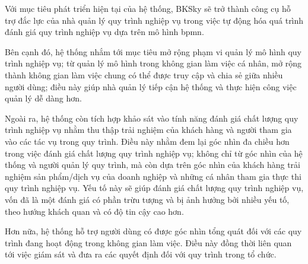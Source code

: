 
Với mục tiêu phát triển hiện tại của hệ thống, BKSky sẽ trở thành công cụ hỗ trợ đắc lực của nhà quản lý quy trình nghiệp vụ trong việc tự động hóa quá trình đánh giá quy trình nghiệp vụ dựa trên mô hình \acrfull*{bpmn}.

Bên cạnh đó, hệ thống nhắm tới mục tiêu mở rộng phạm vi quản lý mô hình quy trình nghiệp vụ; từ quản lý mô hình trong không gian làm việc cá nhân, mở rộng thành không gian làm việc chung có thể được truy cập và chia sẻ giữa nhiều người dùng; điều này giúp nhà quản lý tiếp cận hệ thống và thực hiện công việc quản lý dễ dàng hơn.

Ngoài ra, hệ thống còn tích hợp khảo sát vào tính năng đánh giá chất lượng quy trình nghiệp vụ nhằm thu thập trải nghiệm của khách hàng và người tham gia vào các tác vụ trong quy trình. Điều này nhằm đem lại góc nhìn đa chiều hơn trong việc đánh giá chất lượng quy trình nghiệp vụ; không chỉ từ góc nhìn của hệ thống và người quản lý quy trình, mà còn dựa trên góc nhìn của khách hàng trải nghiệm sản phẩm/dịch vụ của doanh nghiệp và những cá nhân tham gia thực thi quy trình nghiệp vụ. Yếu tố này sẽ giúp đánh giá chất lượng quy trình nghiệp vụ, vốn đã là một đánh giá có phần trừu tượng và bị ảnh hưởng bởi nhiều yếu tố, theo hướng khách quan và có độ tin cậy cao hơn.

Hơn nữa, hệ thống hỗ trợ người dùng có được góc nhìn tổng quát đối với các quy trình đang hoạt động trong không gian làm việc. Điều này đồng thời liên quan tới việc giám sát và đưa ra các quyết định đối với quy trình trong tổ chức.